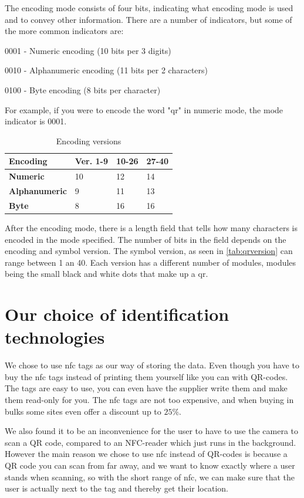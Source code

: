 The encoding mode consists of four bits, indicating what encoding mode is used and to convey other information. There are a number of indicators, but some of the more common indicators are:

\begin{description}
\item 0001 - Numeric encoding (10 bits per 3 digits)
\item 0010 - Alphanumeric encoding (11 bits per 2 characters)
\item 0100 - Byte encoding (8 bits per character)
\end{description}

For example, if you were to encode the word "\ac{qr}" in numeric mode, the mode indicator is 0001.

\begin{table}[H]
\centering
\begin{tabular}{|l|l|l|l|}
\hline
\textbf{Encoding} & \textbf{Ver. 1-9} & \textbf{10-26} & \textbf{27-40} \\
\hline
\textbf{Numeric } & 10 & 12 & 14  \\
\hline
\textbf{Alphanumeric} & 9 & 11 & 13 \\
\hline
\textbf{Byte} & 8 & 16 & 16 \\
\hline
\end{tabular}
\caption{Encoding versions}
\label{tab:qrversion}
\end{table}

After the encoding mode, there is a length field that tells how many characters is encoded in the mode specified. The number of bits in the field depends on the encoding and symbol version\citep{qrcode1}. The symbol version, as seen in \autoref{tab:qrversion} can range between 1 an 40. Each version has a different number of modules, modules being the small black and white dots that make up a \ac{qr}\citep{qrversion}. 

\section{Our choice of identification technologies}
We chose to use \ac{nfc} tags as our way of storing the data. Even though you have to buy the \ac{nfc} tags instead of printing them yourself like you can with QR-codes. The tags are easy to use, you can even have the supplier write them and make them read-only for you. The \ac{nfc} tags are not too expensive, and when buying in bulks some sites even offer a discount up to $25\%$\citep{nfczonen}. 

We also found it to be an inconvenience for the user to have to use the camera to scan a QR code, compared to an NFC-reader which just runs in the background. However the main reason we chose to use \ac{nfc} instead of QR-codes is because a QR code you can scan from far away, and we want to know exactly where a user stands when scanning, so with the short range of \ac{nfc}, we can make sure that the user is actually next to the tag and thereby get their location.